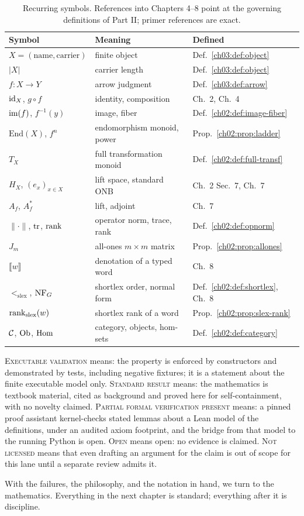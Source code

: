 \begin{table}[htbp]
\centering
\begin{tabular}{@{}lll@{}}
\toprule
Symbol & Meaning & Defined \\
\midrule
$X = (\mathrm{name}, \mathrm{carrier})$ & finite object & Def.~\ref{ch03:def:object} \\
$|X|$ & carrier length & Def.~\ref{ch03:def:object} \\
$f : X \to Y$ & arrow judgment & Def.~\ref{ch03:def:arrow} \\
$\mathrm{id}_X$, $g \circ f$ & identity, composition & Ch.~2, Ch.~4 \\
$\mathrm{im}(f)$, $f^{-1}(y)$ & image, fiber & Def.~\ref{ch02:def:image-fiber} \\
$\mathrm{End}(X)$, $f^{n}$ & endomorphism monoid, power & Prop.~\ref{ch02:prop:ladder} \\
$T_X$ & full transformation monoid & Def.~\ref{ch02:def:full-transf} \\
$H_X$, $(e_x)_{x \in X}$ & lift space, standard ONB & Ch.~2 Sec.~7, Ch.~7 \\
$A_f$, $A_f^{*}$ & lift, adjoint & Ch.~7 \\
$\lVert \cdot \rVert$, $\mathrm{tr}$, $\mathrm{rank}$ & operator norm, trace, rank & Def.~\ref{ch02:def:opnorm} \\
$J_m$ & all-ones $m \times m$ matrix & Prop.~\ref{ch02:prop:allones} \\
$\llbracket w \rrbracket$ & denotation of a typed word & Ch.~8 \\
$<_{\mathrm{slex}}$, $\mathrm{NF}_G$ & shortlex order, normal form & Def.~\ref{ch02:def:shortlex}, Ch.~8 \\
$\mathrm{rank}_{\mathrm{slex}}(w)$ & shortlex rank of a word & Prop.~\ref{ch02:prop:slex-rank} \\
$\mathcal{C}$, $\mathrm{Ob}$, $\mathrm{Hom}$ & category, objects, hom-sets & Def.~\ref{ch02:def:category} \\
\bottomrule
\end{tabular}
\caption{Recurring symbols. References into Chapters 4--8 point at the
governing definitions of Part II; primer references are exact.}
\label{ch01:tab:symbols}
\end{table}

\begin{remark}\label{ch01:rem:status}
\textsc{Executable validation} means: the property is enforced by
constructors and demonstrated by tests, including negative fixtures; it is a
statement about the finite executable model only. \textsc{Standard result}
means: the mathematics is textbook material, cited as background and proved
here for self-containment, with no novelty claimed. \textsc{Partial formal
verification present} means: a pinned proof assistant kernel-checks stated
lemmas about a Lean model of the definitions, under an audited axiom
footprint, and the bridge from that model to the running Python is open.
\textsc{Open} means open: no evidence is claimed. \textsc{Not licensed}
means that even drafting an argument for the claim is out of scope for this
lane until a separate review admits it.
\end{remark}

With the failures, the philosophy, and the notation in hand, we turn to the
mathematics. Everything in the next chapter is standard; everything after it
is discipline.

